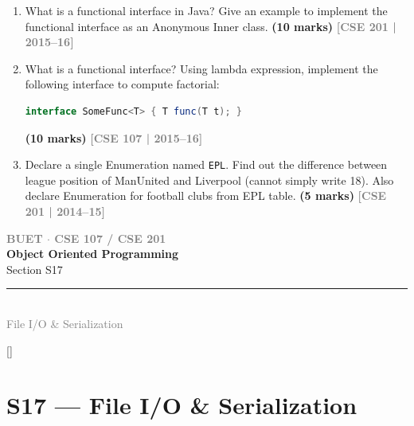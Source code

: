 \documentclass[12pt,a3paper]{article}
\newcommand{\yr}[1]{\hfill\textcolor{gray}{\small\textbf{[#1]}}}
\newcommand{\mk}[1]{\textcolor{orange!70!black}{\small\textbf{(#1 marks)}}}
\newcommand{\secdivider}[4]{%
  \newpage\thispagestyle{empty}%
  \vspace*{\fill}%
  \begin{tcolorbox}[enhanced,colback=#4!7,colframe=#3,boxrule=1.5pt,arc=8pt,
    left=20pt,right=20pt,top=22pt,bottom=22pt,
    shadow={3pt}{-3pt}{0pt}{black!15}]
    \centering
    {\large\textcolor{gray}{\textbf{BUET $\cdot$ CSE 107 / CSE 201}}}\\[8pt]
    {\fontsize{26}{32}\selectfont\bfseries\textcolor{#3}{Object Oriented Programming}}\\[6pt]
    {\fontsize{15}{19}\selectfont\textcolor{dgray}{#1}}\\[12pt]
    \textcolor{#3!60}{\rule{0.5\textwidth}{0.5pt}}\\[6pt]
    {\small\textcolor{gray}{#2}}
  \end{tcolorbox}%
  \vspace*{\fill}\newpage%
}
\begin{document}
\begin{enumerate}




\item What is a functional interface in Java? Give an example to implement the functional interface as an Anonymous Inner class. \mk{10}
\yr{CSE 201 | 2015--16}




\item What is a functional interface? Using lambda expression, implement the following interface to compute factorial:
\begin{lstlisting}[language=Java]
interface SomeFunc<T> { T func(T t); }
\end{lstlisting}
\mk{10}
\yr{CSE 107 | 2015--16}





\item Declare a single Enumeration named \texttt{EPL}. Find out the difference between league position of ManUnited and Liverpool (cannot simply write 18). Also declare Enumeration for football clubs from EPL table. \mk{5}
\yr{CSE 201 | 2014--15}




\end{enumerate}
\newpage

\secdivider{Section S17}{File I/O \& Serialization}{cA}{cA}
\label{sec:S17}
\titleformat{\section}{\large\bfseries\color{cA}}{}{0em}{}[\titlerule]
\section{S17 --- File I/O \& Serialization}
\end{document}
